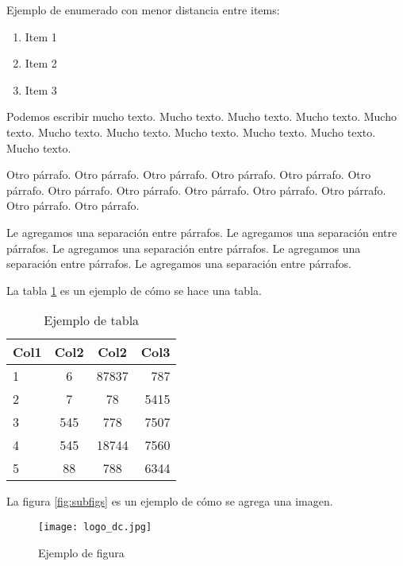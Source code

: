 \documentclass[10pt,a4paper]{article}
\begin{document}
Ejemplo de enumerado con menor distancia entre items:

\begin{enumerate} \setlength\itemsep{0cm}
	\item Item 1
	\item Item 2
	\item Item 3
\end{enumerate}

Podemos escribir mucho texto. Mucho texto. Mucho texto. Mucho texto. Mucho texto. Mucho texto. Mucho texto. Mucho texto. Mucho texto. Mucho texto. Mucho texto.

Otro párrafo. Otro párrafo. Otro párrafo. Otro párrafo. Otro párrafo. Otro párrafo. Otro párrafo. Otro párrafo. Otro párrafo. Otro párrafo. Otro párrafo. Otro párrafo. Otro párrafo.

\vspace{0.3cm}

Le agregamos una separación entre párrafos. Le agregamos una separación entre párrafos. Le agregamos una separación entre párrafos. Le agregamos una separación entre párrafos. Le agregamos una separación entre párrafos.

\vspace{0.3cm}

La tabla \ref{tab:ejemplo} es un ejemplo de cómo se hace una tabla.

\begin{table}[h!]
	\centering
	\begin{tabular}{||l c c r||} 
		\hline
		Col1 & Col2 & Col2 & Col3 \\ [0.5ex] 
		\hline\hline
		1 & 6 & 87837 & 787 \\ 
		2 & 7 & 78 & 5415 \\
		3 & 545 & 778 & 7507 \\
		4 & 545 & 18744 & 7560 \\
		5 & 88 & 788 & 6344 \\
		\hline
	\end{tabular}
	\caption{Ejemplo de tabla}
	\label{tab:ejemplo}
\end{table}


La figura \ref{fig:subfigs} es un ejemplo de cómo se agrega una imagen.

\begin{figure}[ht]
	\centering
	\texttt{[image: logo\_dc.jpg]}
	\caption{Ejemplo de figura}
	\label{fig:ejemplo}
\end{figure}
\end{document}
